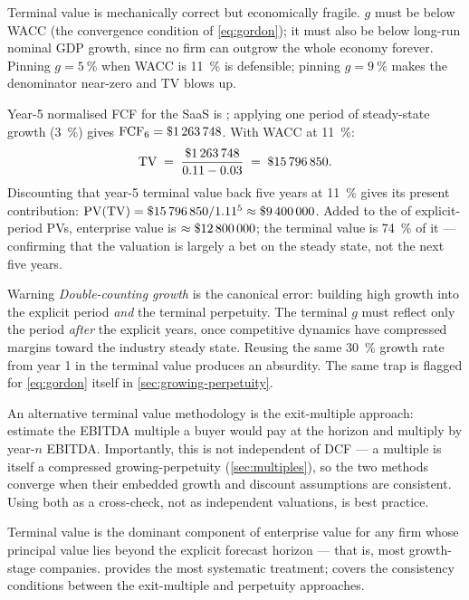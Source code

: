 Terminal value is mechanically correct but economically fragile. \(g\) must be below WACC
(the convergence condition of \cref{eq:gordon}); it must also be below long-run nominal
GDP growth, since no firm can outgrow the whole economy forever. Pinning
\(g=\qty{5}{\percent}\) when WACC is \qty{11}{\percent} is defensible; pinning
\(g=\qty{9}{\percent}\) makes the denominator near-zero and TV blows up.

\begin{example}
Year-5 normalised FCF for the SaaS is ; applying one period of
steady-state growth (\qty{3}{\percent}) gives \(\mathrm{FCF}_{6}=\$\num{1263748}\).
With WACC at \qty{11}{\percent}:
\[
  \mathrm{TV} \;=\; \frac{\$\num{1263748}}{0.11-0.03} \;=\; \$\num{15796850}.
\]
Discounting that year-5 terminal value back five years at \qty{11}{\percent} gives its
present contribution: \(\mathrm{PV}(\mathrm{TV})=\$\num{15796850}/1.11^5\approx\$\num{9400000}\).
Added to the  of explicit-period PVs, enterprise value is
\(\approx\$\num{12800000}\); the terminal value is \qty{74}{\percent} of it ---
confirming that the valuation is largely a bet on the steady state, not the next five
years.
\end{example}

\begin{admonition}{Warning}
\emph{Double-counting growth} is the canonical error: building high growth into
the explicit period \emph{and} the terminal perpetuity. The terminal \(g\) must
reflect only the period \emph{after} the explicit years, once competitive
dynamics have compressed margins toward the industry steady state. Reusing the
same \qty{30}{\percent} growth rate from year 1 in the terminal value produces an
absurdity. The same trap is flagged for \cref{eq:gordon} itself in
\cref{sec:growing-perpetuity}.
\end{admonition}

An alternative terminal value methodology is the exit-multiple approach: estimate the
EBITDA multiple a buyer would pay at the horizon and multiply by year-\(n\) EBITDA.
Importantly, this is not independent of DCF --- a multiple is itself a compressed
growing-perpetuity (\cref{sec:multiples}), so the two methods converge when their embedded
growth and discount assumptions are consistent. Using both as a cross-check, not as
independent valuations, is best practice.

Terminal value is the dominant component of enterprise value for any firm whose principal
value lies beyond the explicit forecast horizon --- that is, most growth-stage companies.
\textcite{damodaran2012} provides the most systematic treatment; \textcite{brealey2020}
covers the consistency conditions between the exit-multiple and perpetuity approaches.

